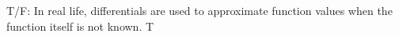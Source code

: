{T/F: In real life, differentials are used to approximate function values when the function itself is not known.
}
{T
}

